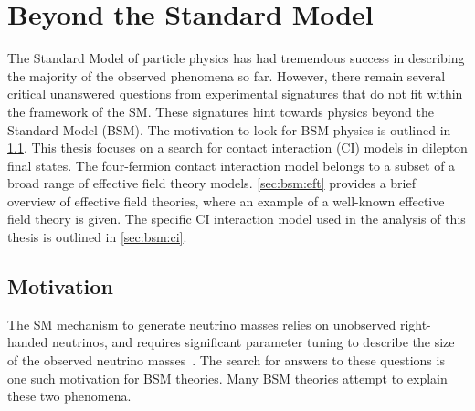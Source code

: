 \chapter{Beyond the Standard Model}\label{chap:bsm}
The Standard Model of particle physics has had tremendous success in describing the majority of the observed phenomena so far. However, there remain several critical unanswered questions from experimental signatures that do not fit within the framework of the SM. These signatures hint towards physics beyond the Standard Model (BSM). The motivation to look for BSM physics is outlined in \cref{sec:bsm:motivation}. This thesis focuses on a search for contact interaction (CI) models in dilepton final states. The four-fermion contact interaction model belongs to a subset of a broad range of effective field theory models. \cref{sec:bsm:eft} provides a brief overview of effective field theories, where an example of a well-known effective field theory is given. The specific CI interaction model used in the analysis of this thesis is outlined in \cref{sec:bsm:ci}.

\section{Motivation}\label{sec:bsm:motivation}

The SM mechanism to generate neutrino masses relies on unobserved right-handed neutrinos, and requires significant parameter tuning to describe the size of the observed neutrino masses~\cite{Fukuda_1998}. The search for answers to these questions is one such motivation for BSM theories. Many BSM theories attempt to explain these two phenomena. 


